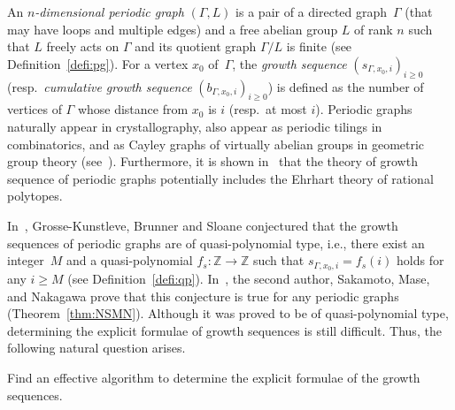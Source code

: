 \documentclass[11pt]{article}
\theoremstyle{definition}
\numberwithin{equation}{section}
\begin{document}
An \textit{$n$-dimensional periodic graph} $(\Gamma, L)$ is a pair of a directed graph~$\Gamma$ (that may have loops and multiple edges) and a free abelian group $L$ of rank $n$ such that $L$ freely acts on $\Gamma$ and its quotient graph $\Gamma/L$ is finite (see Definition~\ref{defi:pg}). 
For a vertex $x_0$ of~$\Gamma$, the \textit{growth sequence} $(s_{\Gamma, x_0, i})_{i \ge 0}$ 
(resp.\ \textit{cumulative growth sequence} $(b_{\Gamma, x_0, i})_{i \ge 0}$) is defined as the number of vertices of $\Gamma$ whose distance from $x_0$ is $i$ (resp.\ at most $i$). 
Periodic graphs naturally appear in crystallography, also appear as periodic tilings in combinatorics, and as Cayley graphs of virtually abelian groups in geometric group theory (see~\cite[Section 13]{GS19}). 
Furthermore, it is shown in~\cite{IN} that the theory of growth sequence of periodic graphs potentially includes the Ehrhart theory of rational polytopes. 

In~\cite{GKBS96}, Grosse-Kunstleve, Brunner and Sloane conjectured 
that the growth sequences of periodic graphs are of quasi-polynomial type, i.e., 
there exist an integer~$M$ and a quasi-polynomial $f_s: \mathbb{Z} \to \mathbb{Z}$ such that 
$s_{\Gamma, x_0, i} = f_s(i)$ holds for any $i \ge M$ (see Definition~\ref{defi:qp}). 
In~\cite{NSMN21}, the second author, Sakamoto, Mase, and Nakagawa prove that this conjecture is true for any periodic graphs (Theorem~\ref{thm:NSMN}). 
Although it was proved to be of quasi-polynomial type, determining the explicit formulae of growth sequences is still difficult. 
Thus, the following natural question arises. 

\begin{quest}[{cf.\ \cite[Question 1.1]{IN}}]\label{quest:algorithm}
Find an effective algorithm to determine the explicit formulae of the growth sequences.
\end{quest}
\end{document}
